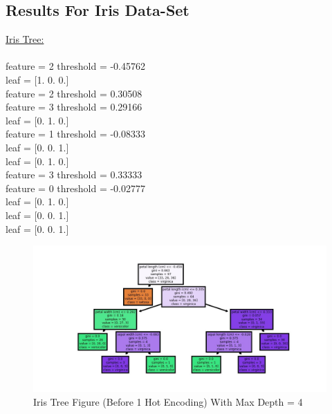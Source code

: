 \documentclass{article}
\begin{document}
\subsection{Results For Iris Data-Set}
\underline{\large{Iris Tree:}}\\ \\
\hspace*{0pt}feature =  2 threshold =  -0.45762\\
\hspace*{15pt}leaf =  [1. 0. 0.]\\
\hspace*{15pt}feature =  2 threshold =  0.30508\\
\hspace*{25pt}feature =  3 threshold =  0.29166\\
\hspace*{40pt}leaf =  [0. 1. 0.]\\
\hspace*{40pt}feature =  1 threshold =  -0.08333\\
\hspace*{50pt}leaf =  [0. 0. 1.]\\
\hspace*{50pt}leaf =  [0. 1. 0.]\\
\hspace*{25pt}feature =  3 threshold =  0.33333\\
\hspace*{40pt}feature =  0 threshold =  -0.02777\\
\hspace*{50pt}leaf =  [0. 1. 0.]\\
\hspace*{50pt}leaf =  [0. 0. 1.]\\
\hspace*{40pt}leaf =  [0. 0. 1.]\\
\begin{figure}[H]

\includegraphics[width=8.5in]{iris tree.jpg}
\caption{Iris Tree Figure (Before 1 Hot Encoding) With Max Depth = 4 }
\end{figure} 
\end{document}
